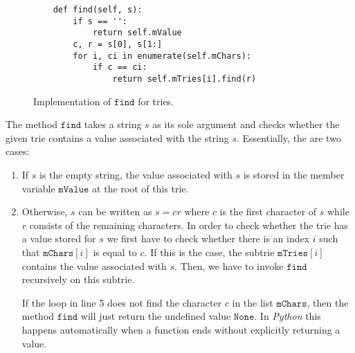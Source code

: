 \begin{figure}[!ht]
\centering
\begin{verbatim}
    def find(self, s):
        if s == '':
            return self.mValue
        c, r = s[0], s[1:]
        for i, ci in enumerate(self.mChars):
            if c == ci:
                return self.mTries[i].find(r)
\end{verbatim}
\vspace*{-0.3cm}
\caption{Implementation of $\texttt{find}$ for tries.}
\label{fig:trie.ipython-find}
\end{figure}

The method $\texttt{find}$ takes a string $s$ as its sole argument and checks whether the given trie
contains a value associated with the string $s$.  Essentially, the are two cases:
\begin{enumerate}
\item If $s$ is the empty string, the value associated with $s$ is stored in the member variable
      $\texttt{mValue}$ at the root of this trie.
\item Otherwise, $s$ can be written as $s = cr$ where $c$ is the first character of $s$ while $r$
      consists of the remaining characters.  In order to check whether the trie has a value stored
      for $s$ we first have to check whether there is an index $i$ such that $\texttt{mChars}[i]$ is
      equal to $c$.  If this is the case, the subtrie $\texttt{mTries}[i]$ contains the value
      associated with $s$.  Then, we have to invoke $\texttt{find}$ recursively on this subtrie.

      If the loop in line 5 does not find the character $c$ in the list $\texttt{mChars}$, then the method
      $\texttt{find}$ will just return the undefined value $\texttt{None}$.  In \textsl{Python} this happens
      automatically when a function ends without explicitly returning a value.
\end{enumerate}


